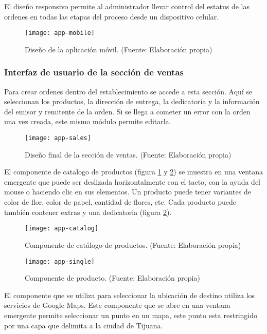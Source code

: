 El diseño responsivo permite al administrador llevar control del estatus de las ordenes en todas las etapas del proceso desde un dispositivo celular.
\vspace{0.8cm}

\begin{figure}[H]
  \centering
  \texttt{[image: app-mobile]}
  \caption{Diseño de la aplicación móvil. (Fuente: Elaboración propia)}
\end{figure}
\vspace{0.8cm}

\subsubsection{Interfaz de usuario de la sección de ventas}
Para crear ordenes dentro del establecimiento se accede a esta sección. Aquí se seleccionan los productos, la dirección de entrega, la dedicatoria y la información del emisor y remitente de la orden. Si se llega a cometer un error con la orden una vez creada, este mismo módulo permite editarla.
\vspace{0.8cm}

\begin{figure}[H]
  \centering
  \texttt{[image: app-sales]}
  \caption{Diseño final de la sección de ventas. (Fuente: Elaboración propia)}
\end{figure}

El componente de catalogo de productos (figura \ref{catalog} y \ref{single-product}) se muestra en una ventana emergente que puede ser deslizada horizontalmente con el tacto, con la ayuda del mouse o haciendo clic en sus elementos. Un producto puede tener variantes de color de flor, color de papel, cantidad de flores, etc. Cada producto puede también contener extras y una dedicatoria (figura \ref{single-product}).

\begin{figure}[H]
  \centering
  \texttt{[image: app-catalog]}
  \caption{Componente de catálogo de productos. (Fuente: Elaboración propia)}
  \label{catalog}
\end{figure}

\begin{figure}[H]
  \centering
  \texttt{[image: app-single]}
  \caption{Componente de producto. (Fuente: Elaboración propia)}
  \label{single-product}
\end{figure}

El componente que se utiliza para seleccionar la ubicación de destino utiliza los servicios de Google Maps. Este componente que se abre en una ventana emergente permite seleccionar un punto en un mapa, este punto esta restringido por una capa que delimita a la ciudad de Tijuana.
\vspace{0.8cm}


